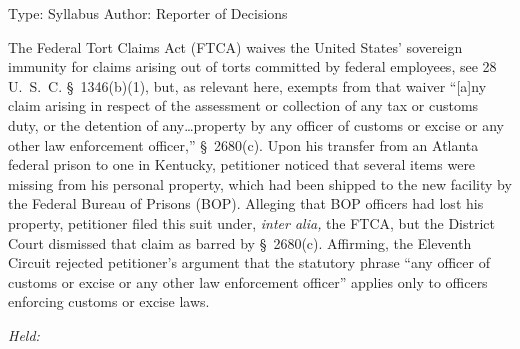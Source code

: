 Type: Syllabus
Author: Reporter of Decisions

\setcounter{page}{214}

  The Federal Tort Claims Act (FTCA) waives the United States' sovereign immunity for claims arising out of torts committed by federal employees, see 28 U.~S.~C. \S~1346(b)(1), but, as relevant here, exempts from that waiver ``[a]ny claim arising in respect of the assessment or collection of any tax or customs duty, or the detention of any\dots property by any officer of customs or excise or any other law enforcement officer,'' \S~2680(c). Upon his transfer from an Atlanta federal prison to one in Kentucky, petitioner noticed that several items were missing from his personal property, which had been shipped to the new facility by the Federal Bureau of Prisons (BOP). Alleging that BOP officers had lost his property, petitioner filed this suit under, \emph{inter alia,} the FTCA, but the District Court dismissed that claim as barred by \S~2680(c). Affirming, the Eleventh Circuit rejected petitioner's argument that the statutory phrase ``any officer of customs or excise or any other law enforcement officer'' applies only to officers enforcing customs or excise laws.

\emph{Held:}

